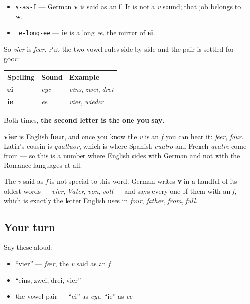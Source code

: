 \begin{sounds}
\begin{itemize}
\raggedright
  \item \texttt{v-as-f} — German \textbf{v} is said as an \textbf{f}. It is not a \emph{v} sound; that job belongs to \textbf{w}.
  \item \texttt{ie-long-ee} — \textbf{ie} is a long \emph{ee}, the mirror of \textbf{ei}.
\end{itemize}

So \emph{vier} is \emph{feer}. Put the two vowel rules side by side and the pair is settled for good:

\noindent
\begin{tabularx}{\linewidth}{@{}>{\raggedright\arraybackslash}X>{\raggedright\arraybackslash}X>{\raggedright\arraybackslash}X@{}}
\toprule
\textbf{Spelling} & \textbf{Sound} & \textbf{Example} \\
\midrule
\textbf{ei} & \emph{eye} & \emph{eins}, \emph{zwei}, \emph{drei} \\
\textbf{ie} & \emph{ee} & \emph{vier}, \emph{wieder} \\
\bottomrule
\end{tabularx}

Both times, \textbf{the second letter is the one you say}.
\end{sounds}

\begin{cousinweb}
\textbf{vier} is English \textbf{four}, and once you know the \emph{v} is an \emph{f} you can hear it: \emph{feer}, \emph{four}. Latin's cousin is \emph{quattuor}, which is where Spanish \emph{cuatro} and French \emph{quatre} come from — so this is a number where English sides with German and not with the Romance languages at all.

The \emph{v}-said-as-\emph{f} is not special to this word. German writes \textbf{v} in a handful of its oldest words — \emph{vier}, \emph{Vater}, \emph{von}, \emph{voll} — and says every one of them with an \emph{f}, which is exactly the letter English uses in \emph{four}, \emph{father}, \emph{from}, \emph{full}.
\end{cousinweb}

\subsection*{Your turn}
Say these aloud:

\begin{itemize}
\raggedright
  \item \textquotedblleft{}vier\textquotedblright{} — \emph{feer}, the \emph{v} said as an \emph{f}
  \item \textquotedblleft{}eins, zwei, drei, vier\textquotedblright{}
  \item the vowel pair — \textquotedblleft{}ei\textquotedblright{} as \emph{eye}, \textquotedblleft{}ie\textquotedblright{} as \emph{ee}
\end{itemize}


